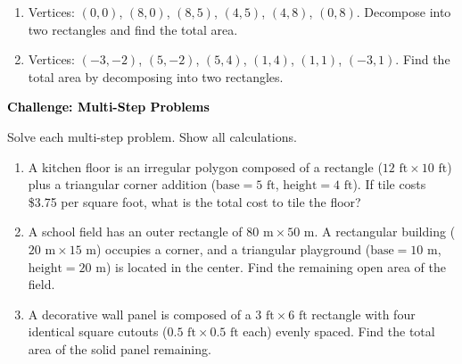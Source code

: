 \documentclass[12pt, letterpaper, fleqn]{article}
\begin{document}
\begin{enumerate}[itemsep=2.3cm, leftmargin=0.6cm]

\item Vertices: $(0, 0)$, $(8, 0)$, $(8, 5)$, $(4, 5)$, $(4, 8)$, $(0, 8)$. Decompose into two rectangles and find the total area.

\vspace{6cm}

\item Vertices: $(-3, -2)$, $(5, -2)$, $(5, 4)$, $(1, 4)$, $(1, 1)$, $(-3, 1)$. Find the total area by decomposing into two rectangles.

\vspace{2.5cm}

\end{enumerate}

\newpage

\begin{tcolorbox}[colback=black!10]
\large\textcolor{black}{\textbf{Challenge: Multi-Step Problems}}
\end{tcolorbox}

\noindent
Solve each multi-step problem. Show all calculations.

\vspace{3mm}

\begin{enumerate}[itemsep=2.4cm, leftmargin=0.6cm]

\item A kitchen floor is an irregular polygon composed of a rectangle ($12\text{ ft} \times 10\text{ ft}$) plus a triangular corner addition ($\text{base} = 5\text{ ft}$, $\text{height} = 4\text{ ft}$). If tile costs \$3.75 per square foot, what is the total cost to tile the floor?

\vspace{2.3cm}

\item A school field has an outer rectangle of $80\text{ m} \times 50\text{ m}$. A rectangular building ($20\text{ m} \times 15\text{ m}$) occupies a corner, and a triangular playground ($\text{base} = 10\text{ m}$, $\text{height} = 20\text{ m}$) is located in the center. Find the remaining open area of the field.

\vspace{2.3cm}

\item A decorative wall panel is composed of a $3\text{ ft} \times 6\text{ ft}$ rectangle with four identical square cutouts ($0.5\text{ ft} \times 0.5\text{ ft}$ each) evenly spaced. Find the total area of the solid panel remaining.

\vspace{2.5cm}

\end{enumerate}
\end{document}
